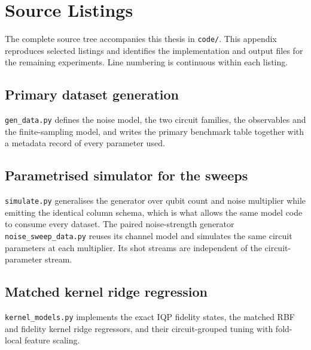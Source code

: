 
\chapter{Source Listings}

\label{AppendixC}

The complete source tree accompanies this thesis in \texttt{code/}. This
appendix reproduces selected listings and identifies the implementation
and output files for the remaining experiments. Line numbering is
continuous within each listing.

\section{Primary dataset generation}

\texttt{gen\_data.py} defines the noise model, the two circuit families, the
observables and the finite-sampling model, and writes the primary benchmark table
together with a metadata record of every parameter used.



\section{Parametrised simulator for the sweeps}

\texttt{simulate.py} generalises the generator over qubit count and noise multiplier
while emitting the identical column schema, which is what allows the same model code
to consume every dataset. The paired noise-strength generator
\texttt{noise\_sweep\_data.py} reuses its channel model and simulates the same
circuit parameters at each multiplier. Its shot streams are independent of the
circuit-parameter stream.



\section{Matched kernel ridge regression}

\texttt{kernel\_models.py} implements the exact IQP fidelity states, the matched RBF
and fidelity kernel ridge regressors, and their circuit-grouped tuning with fold-local
feature scaling.

